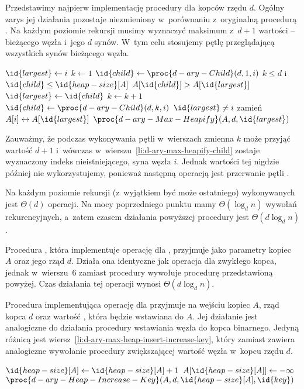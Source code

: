 \subproblem %
Przedstawimy najpierw implementację procedury  dla kopców rzędu $d$. Ogólny zarys jej działania pozostaje niezmieniony w~porównaniu z~oryginalną procedurą . Na każdym poziomie rekursji musimy wyznaczyć maksimum z~$d+1$ wartości -- bieżącego węzła i~jego $d$ synów. W~tym celu stosujemy pętlę przeglądającą wszystkich synów bieżącego węzła.
\begin{codebox}
\li	$\id{largest}\gets i$
\li	$k\gets1$
\li	$\id{child}\gets\proc{d-ary-Child}(d,1,i)$
\li	\While $k\le d$ i~$\id{child}\le\id{heap-size}[A]$ \label{li:d-ary-max-heapify-while-begin}
\li		\Do
			\If $A[\id{child}]>A[\id{largest}]$
\li				\Then $\id{largest}\gets\id{child}$
				\End
\li			$k\gets k+1$
\li			$\id{child}\gets\proc{d-ary-Child}(d,k,i)$ \label{li:d-ary-max-heapify-child}
		\End \label{li:d-ary-max-heapify-while-end}
\li	\If $\id{largest}\ne i$
\li		\Then
			zamień $A[i]\leftrightarrow A[\id{largest}]$
\li			$\proc{d-ary-Max-Heapify}(A,d,\id{largest})$
		\End
\end{codebox}
Zauważmy, że podczas wykonywania pętli  w~wierszach \twodashes{\ref{li:d-ary-max-heapify-while-begin}}{\ref{li:d-ary-max-heapify-while-end}} zmienna $k$ może przyjąć wartość $d+1$ i~wówczas w~wierszu~\ref{li:d-ary-max-heapify-child} zostaje wyznaczony indeks nieistniejącego,  syna węzła $i$. Jednak wartości tej nigdzie później nie wykorzystujemy, ponieważ następną operacją jest przerwanie pętli .

Na każdym poziomie rekursji (z~wyjątkiem być może ostatniego) wykonywanych jest $\Theta(d)$ operacji. Na mocy poprzedniego punktu mamy $\Theta(\log_dn)$ wywołań rekurencyjnych, a~zatem czasem działania powyższej procedury jest $\Theta(d\log_dn)$.

Procedura , która implementuje operację  dla , przyjmuje jako parametry kopiec $A$ oraz jego rząd $d$. Działa ona identyczne jak operacja  dla zwykłego kopca, jednak w~wierszu~6 zamiast procedury  wywołuje procedurę  przedstawioną powyżej. Czas działania tej operacji wynosi $\Theta(d\log_dn)$.

\subproblem %
Procedura  implementująca operację  dla  przyjmuje na wejściu kopiec $A$, rząd kopca $d$ oraz wartość , która będzie wstawiana do $A$. Jej działanie jest analogiczne do działania procedury wstawiania węzła do kopca binarnego. Jedyną różnicą jest wiersz~\ref{li:d-ary-max-heap-insert-increase-key}, który zamiast  zawiera analogiczne wywołanie procedury  zwiększającej wartość węzła w~kopcu rzędu $d$.
\begin{codebox}
\li	$\id{heap-size}[A]\gets\id{heap-size}[A]+1$
\li	$A[\id{heap-size}[A]]\gets-\infty$
\li	$\proc{d-ary-Heap-Increase-Key}(A,d,\id{heap-size}[A],\id{key})$ \label{li:d-ary-max-heap-insert-increase-key}
\end{codebox}

